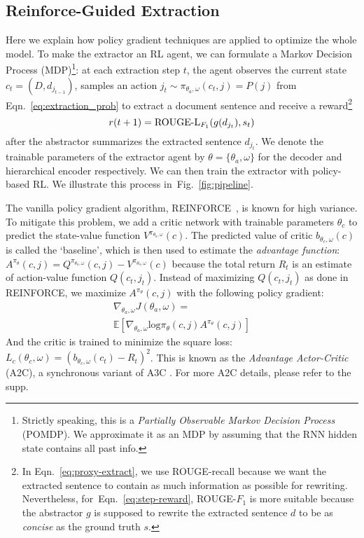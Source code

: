 \documentclass[11pt,a4paper]{article}
\def\figref#1{Fig.~\ref{#1}}
\def\eqnref#1{Eqn.~\ref{#1}}
\begin{document}
\subsection{Reinforce-Guided Extraction}
\label{sec:rl-ext}
Here we explain how policy gradient techniques are applied to optimize the whole model.
To make the extractor an RL agent, we can formulate a Markov Decision Process (MDP)\footnote{Strictly speaking, this is a \textit{Partially Observable Markov Decision Process} (POMDP). 
We approximate it as an MDP by assuming that the RNN hidden state contains all past info.}: 
at each extraction step $t$, the agent observes the current state $c_t = (D, d_{j_{t-1}})$, 
samples an action 
$j_t \sim \pi_{\theta_a, \omega}(c_t, j)
= P(j)$ from \eqnref{eq:extraction_prob}
to extract a document sentence and 
receive a reward\footnote{In \eqnref{eq:proxy-extract}, we use ROUGE-recall because we want the extracted sentence to contain as much information as possible for rewriting.
Nevertheless, for~\eqnref{eq:step-reward}, ROUGE-$F_1$ is more suitable because the abstractor $g$ is supposed to rewrite the extracted sentence $d$ to be as \textit{concise} as the ground truth $s$.
}
\vspace{-5pt}
\begin{equation}
\label{eq:step-reward}
r(t+1) = \text{ROUGE-L}_{F_1}(g(d_{j_t}), s_t)
\vspace{-5pt}
\end{equation}
after the abstractor summarizes the extracted sentence $d_{j_t}$.
We denote the trainable parameters of the extractor agent 
by $\theta = \{\theta_a, \omega \}$ for the decoder and hierarchical encoder respectively.
We can then train the extractor with policy-based RL.
We illustrate this process in~\figref{fig:pipeline}.

The vanilla policy gradient algorithm, REINFORCE~\citep{Williams:1992:SSG:139611.139614}, is known for high variance.
To mitigate this problem, we add a critic network with trainable parameters $\theta_c$ to predict the state-value function $V^{\pi_{\theta_a, \omega}}(c)$.
The predicted value of critic $b_{\theta_c, \omega}(c)$ is called the `baseline',
which is then used to estimate the \textit{advantage function}:
$
A^{\pi_\theta}(c, j) = 
Q^{\pi_{\theta_a, \omega}}(c, j) - 
V^{\pi_{\theta_a, \omega}}(c)
$
because the total return $R_t$ is an estimate of action-value function $Q(c_t, j_t)$.
Instead of maximizing $Q(c_t, j_t)$ as done in REINFORCE, we maximize $A^{\pi_\theta}(c, j)$ with the following policy gradient:
\vspace{-5pt}
\begin{equation}
\begin{split}
\nabla_{\theta_a, \omega} J(\theta_a, \omega) = \\
\mathbb{E}
[\nabla_{\theta_a, \omega}\text{log}\pi_\theta(c, j) A^{\pi_{\theta}}(c, j)]
\end{split}
\end{equation}
And the critic is trained to minimize the square loss:
$
L_c(\theta_c, \omega) = (b_{\theta_c, \omega}(c_t) - R_t)^2
$.
This is known as the \textit{Advantage Actor-Critic} (A2C), a synchronous variant of A3C \citep{pmlr-v48-mniha16}.
For more A2C details, please refer to the supp.
\end{document}
